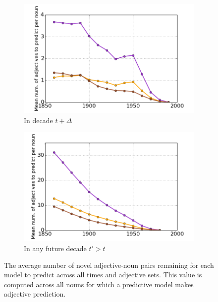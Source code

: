 \documentclass[output=paper]{langsci/langscibook}
\begin{document}
\begin{figure}
\begin{subfigure}[b]{.48\textwidth}
  \centering
  \includegraphics[width=.96\linewidth]{figures/GREWAL_number_of_pairs_to_predict.png}
  \caption{In decade $t + \Delta$}
\end{subfigure}\begin{subfigure}[b]{.48\textwidth}
  \centering
  \includegraphics[width=.96\linewidth]{figures/GREWAL_number_of_pairs_to_predict_future.png}
  \caption{In any future decade $t' > t$}
\end{subfigure}
\caption{The average number of novel adjective-noun pairs remaining for each model to predict across all times and adjective sets.
This value is computed across all nouns for which a predictive model makes adjective prediction.
\label{fig:number_of_new_pairs}}
\end{figure}
\clearpage

\end{document}
